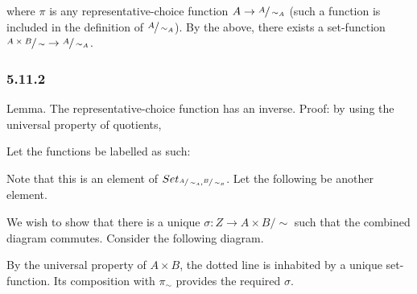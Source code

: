 \documentclass{article}
\begin{document}
where $\pi$ is any representative-choice function $A \to \sfrac{A}{\sim_A}$ (such a function is included in the definition of $\sfrac{A}{\sim_A}$). By the above, there exists a set-function $\sfrac{A \times B}{\sim} \to \sfrac{A}{\sim_A}$.

\subsubsection*{5.11.2}

Lemma. The representative-choice function has an inverse. Proof: by using the universal property of quotients,


Let the functions be labelled as such:


Note that this is an element of $Set_{\sfrac{A}{\sim_A}, \sfrac{B}{\sim_B}}$. Let the following be another element.


We wish to show that there is a unique $\sigma: Z \to A \times B / \sim$ such that the combined diagram commutes. Consider the following diagram.


By the universal property of $A \times B$, the dotted line is inhabited by a unique set-function. Its composition with $\pi_\sim$ provides the required $\sigma$.
\end{document}
